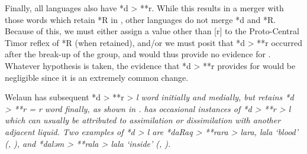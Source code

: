 Finally, all  languages also have *d > **r.
While this results in a merger with those words which retain
*R in , other languages do not merge *d and *R.
Because of this, we must either assign a value other than [r]
to the Proto-Central Timor reflex of *R (when retained),
and/or we must posit that *d > **r occurred after the break-up
of the group, and would thus provide no evidence for .
Whatever hypothesis is taken,
the evidence that *d > **r provides for  would
be negligible since it is an extremely common change.

Welaun has subsequent *d > **r > \it{l} word initially
and medially, but retains *d > **r = \it{r} word finally,
as shown in .
 has occasional instances of *d > **r > \it{l} which
can usually be attributed to assimilation or dissimilation with another adjacent liquid.
Two examples of  *d > \it{l} are *daRaq > **rara
> \it{lara, lala} ‘blood’ (, ),
and *daləm > **rala > \it{lala} ‘inside’ (, ).


